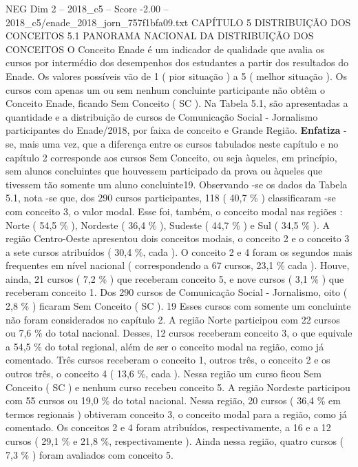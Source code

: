 \begin{textsample}{NEG Dim 2 – 2018\_c5 – Score -2.00 – 2018\_c5/enade\_2018\_jorn\_757f1bfa09.txt}  \label{ex:f2_neg_120}
CAPÍTULO 5 DISTRIBUIÇÃO DOS CONCEITOS 5.1 PANORAMA NACIONAL DA DISTRIBUIÇÃO DOS CONCEITOS O Conceito Enade é um indicador de qualidade que avalia os cursos por intermédio dos desempenhos dos estudantes a partir dos resultados do Enade.
Os valores possíveis vão de 1 ( pior situação ) a 5 ( melhor situação ).
Os cursos com apenas um ou sem nenhum concluinte participante não obtêm o Conceito Enade, ficando Sem Conceito ( SC ).
Na Tabela 5.1, são apresentadas a quantidade e a distribuição de cursos de Comunicação Social - Jornalismo participantes do Enade/2018, por faixa de conceito e Grande Região. \textbf{Enfatiza} -se, mais uma vez, que a diferença entre os cursos tabulados neste capítulo e no capítulo 2 corresponde aos cursos Sem Conceito, ou seja àqueles, em princípio, sem alunos concluintes que houvessem participado da prova ou àqueles que tivessem tão somente um aluno concluinte19.
Observando -se os dados da Tabela 5.1, nota -se que, dos 290 cursos participantes, 118 ( 40,7 \% ) classificaram -se com conceito 3, o valor modal.
Esse foi, também, o conceito modal nas regiões : Norte ( 54,5 \% ), Nordeste ( 36,4 \% ), Sudeste ( 44,7 \% ) e Sul ( 34,5 \% ).
A região Centro-Oeste apresentou dois conceitos modais, o conceito 2 e o conceito 3 a sete cursos atribuídos ( 30,4 \%, cada ).
O conceito 2 e 4 foram os segundos mais frequentes em nível nacional ( correspondendo a 67 cursos, 23,1 \% cada ).
Houve, ainda, 21 cursos ( 7,2 \% ) que receberam conceito 5, e nove cursos ( 3,1 \% ) que receberam conceito 1.
Dos 290 cursos de Comunicação Social - Jornalismo, oito ( 2,8 \% ) ficaram Sem Conceito ( SC ). 19 Esses cursos com somente um concluinte não foram considerados no capítulo 2.
A região Norte participou com 22 cursos ou 7,6 \% do total nacional.
Desses, 12 cursos receberam conceito 3, o que equivale a 54,5 \% do total regional, além de ser o conceito modal na região, como já comentado.
Três cursos receberam o conceito 1, outros três, o conceito 2 e os outros três, o conceito 4 ( 13,6 \%, cada ).
Nessa região um curso ficou Sem Conceito ( SC ) e nenhum curso recebeu conceito 5.
A região Nordeste participou com 55 cursos ou 19,0 \% do total nacional.
Nessa região, 20 cursos ( 36,4 \% em termos regionais ) obtiveram conceito 3, o conceito modal para a região, como já comentado.
Os conceitos 2 e 4 foram atribuídos, respectivamente, a 16 e a 12 cursos ( 29,1 \% e 21,8 \%, respectivamente ).
Ainda nessa região, quatro cursos ( 7,3 \% ) foram avaliados com conceito 5.

\end{textsample}
